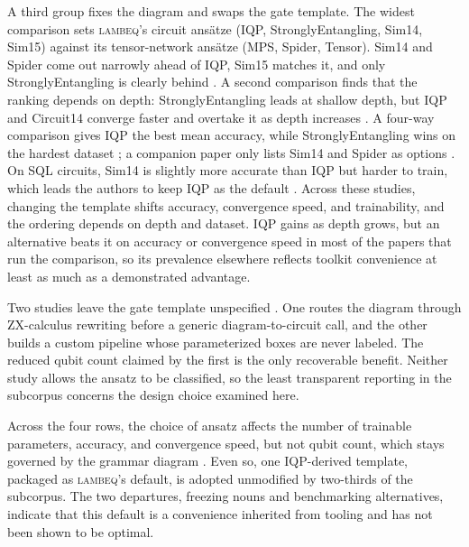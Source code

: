 \documentclass{ieeeaccess}
\begin{document}
A third group fixes the diagram and swaps the gate template.
The widest comparison sets \textsc{lambeq}'s circuit ansätze (IQP, StronglyEntangling, Sim14, Sim15) against its tensor-network ansätze (MPS, Spider, Tensor). Sim14 and Spider come out narrowly ahead of IQP, Sim15 matches it, and only StronglyEntangling is clearly behind \cite{castillo_comparative_2025}. A second comparison finds that the ranking depends on depth: StronglyEntangling leads at shallow depth, but IQP and Circuit14 converge faster and overtake it as depth increases \cite{metawei_topic-aware_2023}. A four-way comparison gives IQP the best mean accuracy, while StronglyEntangling wins on the hardest dataset \cite{peral-garcia_comparing_2024}; a companion paper only lists Sim14 and Spider as options \cite{peral-garcia_using_2024}. On SQL circuits, Sim14 is slightly more accurate than IQP but harder to train, which leads the authors to keep IQP as the default \cite{uotila_sql2circuits_2025}.
Across these studies, changing the template shifts accuracy, convergence speed, and trainability, and the ordering depends on depth and dataset. IQP gains as depth grows, but an alternative beats it on accuracy or convergence speed in most of the papers that run the comparison, so its prevalence elsewhere reflects toolkit convenience at least as much as a demonstrated advantage.

Two studies leave the gate template unspecified \cite{sreedhar_towards_2025,liu_research_2024}.
One routes the diagram through ZX-calculus rewriting before a generic diagram-to-circuit call, and the other builds a custom pipeline whose parameterized boxes are never labeled.
The reduced qubit count claimed by the first is the only recoverable benefit. Neither study allows the ansatz to be classified, so the least transparent reporting in the subcorpus concerns the design choice examined here.

Across the four rows, the choice of ansatz affects the number of trainable parameters, accuracy, and convergence speed, but not qubit count, which stays governed by the grammar diagram \cite{sreedhar_towards_2025,uotila_sql2circuits_2025}. Even so, one IQP-derived template, packaged as \textsc{lambeq}'s default, is adopted unmodified by two-thirds of the subcorpus. The two departures, freezing nouns and benchmarking alternatives, indicate that this default is a convenience inherited from tooling and has not been shown to be optimal.
\end{document}
